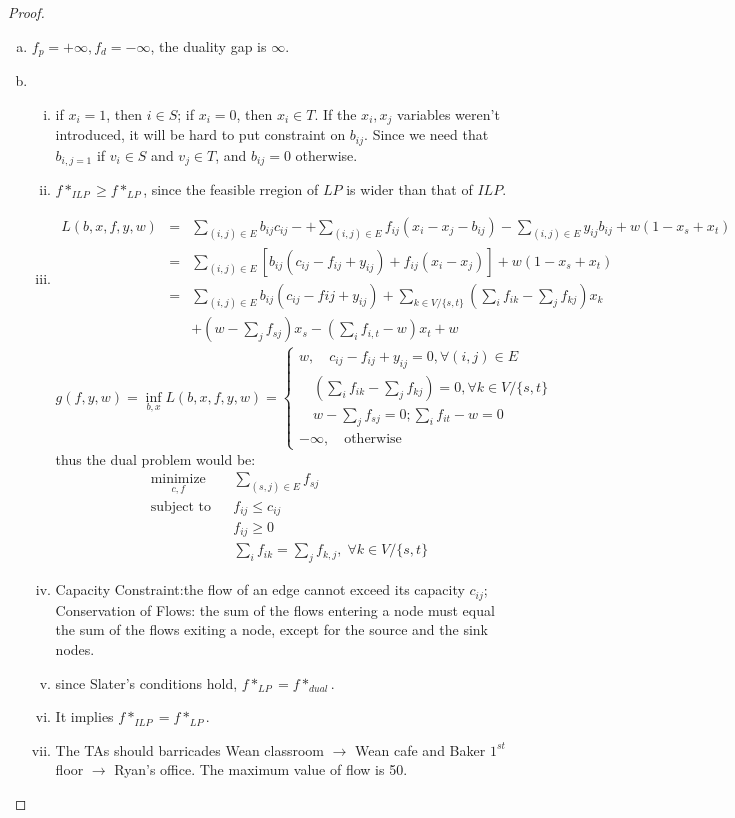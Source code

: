 \documentclass{article}
\theoremstyle{remark}
\theoremstyle{definition}
\begin{document}
\begin{proof}
\begin{enumerate}[(a)]
    \item $f_p= +\infty, f_d=-\infty$, the duality gap is $\infty$.
    \item \begin{enumerate}[(i)]
        \item if $x_i=1$, then $i\in S$; if $x_i=0$, then $x_i\in T$. If the $x_i,x_j$ variables weren't introduced, it will be hard to put constraint on $b_{ij}$. Since we need that $b_{i,j=1}$ if $v_i\in S$ and $v_j\in T$, and $b_{ij}=0$ otherwise.
        \item $f*_{ILP}\geq f*_{LP}$, since the feasible rregion of $LP$ is wider than that of $ILP$.
        \item \begin{eqnarray*}L(b,x,f,y,w) & = &\sum_{(i,j)\in E}b_{ij}c_{ij}-+\sum_{(i,j)\in E} f_{ij}(x_i-x_j-b_{ij})-\sum_{(i,j)\in E}y_{ij}b_{ij}+w(1-x_s+x_t)\\
            & = & \sum_{(i,j)\in E}[b_{ij}(c_{ij}-f_{ij}+y_{ij})+f_{ij}(x_i-x_j)]+w(1-x_s+x_t)\\
            & = & \sum_{(i,j)\in E}b_{ij}(c_{ij}-f{ij}+y_{ij})+\sum_{k\in V/\{s,t\}}(\sum_i f_{ik}-\sum_{j}f_{kj})x_k\\
            &~&+(w-\sum_jf_{sj})x_s- (\sum_if_{i,t}-w)x_t+w
            \end{eqnarray*}
\[g(f,y,w)=\inf_{b,x}L(b,x,f,y,w)=\begin{cases}
    w, \quad  c_{ij}-f_{ij}+y_{ij}=0, \forall (i,j)\in E \\
     \quad (\sum_i f_{ik}-\sum_{j}f_{kj})=0,\forall k\in V/ \{s,t\}\\
     \quad w-\sum_jf_{sj}=0; \sum_if_{it}-w=0 \\
   -\infty, \quad \text{otherwise}
    \end{cases}\]
 thus the dual problem would be:
 \begin{equation*}
\begin{aligned}
& \underset{c,f} {\text{minimize}}
& & \sum_{(s,j)\in E}f_{sj} \\
& \text{subject to}
&& f_{ij} \leq  c_{ij}\\
&&& f_{ij}\geq 0\\
&&& \sum_i f_{ik}=\sum_{j}f_{k,j},\; \forall k\in V /\{s,t\}
\end{aligned}
\end{equation*}
\item  Capacity Constraint:the flow of an edge cannot exceed its capacity $c_{ij}$;  Conservation of Flows: the sum of the flows entering a node must equal the sum of the flows exiting a node, except for the source and the sink nodes.
\item since Slater's conditions hold, $f*_{LP}=f*_{dual}$.
\item It implies $f*_{ILP}=f*_{LP}$.
\item The TAs should barricades Wean classroom $\rightarrow$ Wean cafe and Baker $1^{st}$ floor $\rightarrow$ Ryan's office. The maximum value of  flow is 50.
        \end{enumerate}
\end{enumerate}
\end{proof}
\end{document}
